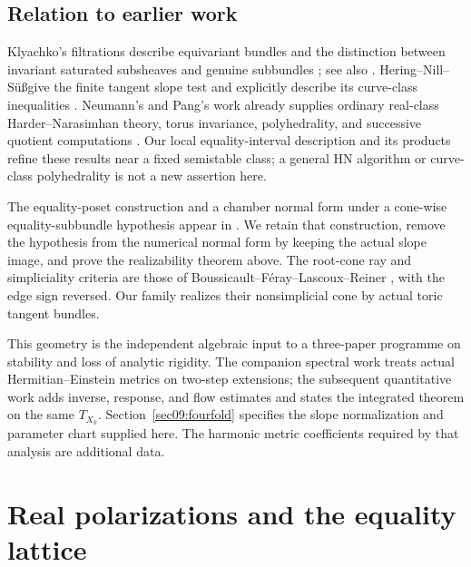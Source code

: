\documentclass[11pt]{amsart}
\theoremstyle{definition}
\theoremstyle{remark}
\begin{document}
\subsection*{Relation to earlier work}
Klyachko's filtrations describe equivariant bundles and the distinction
between invariant saturated subsheaves and genuine subbundles
\cite{klyachko1990}; see also \cite[Proposition~4.1.1]{khandasgupta2019}.
Hering--Nill--S\"u\ss give the finite tangent slope test and explicitly
describe its curve-class inequalities
\cite[Proposition~1.2, Remark~2.6, and \S5]{heringnillsuess2022}.
Neumann's and Pang's work already supplies ordinary real-class
Harder--Narasimhan theory, torus invariance, polyhedrality, and
successive quotient computations
\cite[\S3.3]{neumann2009}\cite[\S\S1.3,2.1--2.2]{pang2015}.
Our local equality-interval description and its products refine these
results near a fixed semistable class; a general HN algorithm or
curve-class polyhedrality is not a new assertion here.

The equality-poset construction and a chamber normal form under a
cone-wise equality-subbundle hypothesis appear in
\cite{wuebben2026toricchambers}. We retain that construction, remove the
hypothesis from the numerical normal form by keeping the actual slope
image, and prove the realizability theorem above. The root-cone ray
and simpliciality criteria are those of
Boussicault--F\'eray--Lascoux--Reiner
\cite[\S5]{boussicaultferaylascouxreiner2012}, with the edge sign
reversed. Our family realizes their nonsimplicial cone by actual toric
tangent bundles.

This geometry is the independent algebraic input to a three-paper
programme on stability and loss of analytic rigidity. The companion
spectral work treats actual Hermitian--Einstein metrics on two-step
extensions; the subsequent quantitative work adds inverse, response,
and flow estimates and states the integrated theorem on the same
\(T_{X_k}\). Section~\ref{sec09:fourfold} specifies the slope
normalization and parameter chart supplied here. The harmonic metric
coefficients required by that analysis are additional data.

\section{Real polarizations and the equality lattice}\label{sec02:equality}
\end{document}
